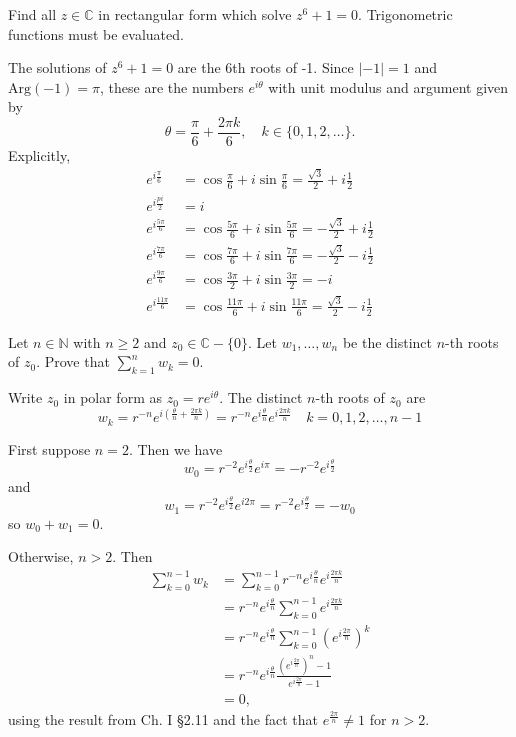 \documentclass{article}
\newcounter{Problem}
\newenvironment{Problem}{\begin{Exercise}[name={Problem},
                                          counter={Problem}]}
                        {\end{Exercise}}
\begin{document}
\begin{Problem}
Find all $z \in \mathbb{C}$ in rectangular form which solve
$z^6 + 1 = 0$. Trigonometric functions must be evaluated.
\end{Problem}

\begin{Answer}
The solutions of $z^6 + 1 = 0$ are the 6th roots of -1. Since $|-1| =
1$ and $\mathrm{Arg}(-1) = \pi$, these are the numbers $e^{i\theta}$ with unit
modulus and argument given by
$$
  \theta
= \frac{\pi}{6} + \frac{2 \pi k}{6},
\quad k \in \{ 0, 1, 2, \dots \}.
$$
Explicitly,
\begin{align*}
   e^{i\frac{\pi}{6}}
&= \cos \frac{\pi}{6} + i \sin \frac{\pi}{6}
 = \frac{\sqrt{3}}{2} + i \frac{1}{2} \\
   e^{i\frac{pi}{2}}
&= i \\
   e^{i\frac{5 \pi}{6}}
&= \cos \frac{5\pi}{6} + i \sin \frac{5\pi}{6}
 = -\frac{\sqrt{3}}{2} + i \frac{1}{2} \\
   e^{i\frac{7\pi}{6}}
&= \cos \frac{7\pi}{6} + i \sin \frac{7\pi}{6}
 = -\frac{\sqrt{3}}{2} - i \frac{1}{2} \\
   e^{i\frac{9\pi}{6}}
&= \cos \frac{3\pi}{2} + i \sin \frac{3\pi}{2}
 = -i \\
   e^{i\frac{11\pi}{6}}
&= \cos \frac{11\pi}{6} + i \sin \frac{11\pi}{6}
 = \frac{\sqrt{3}}{2} - i \frac{1}{2}
\end{align*}

\end{Answer}

\begin{Problem}
Let $n \in \mathbb{N}$ with $n \geq 2$ and
$z_0 \in \mathbb{C} - \{ 0 \}$.
Let $w_1, \dots, w_n$ be the distinct $n$-th roots of $z_0$.
Prove that $\sum_{k=1}^n w_k = 0$.
\end{Problem}

\begin{Answer}
Write $z_0$ in polar form as $z_0 = r e^{i \theta}$. The
distinct $n$-th roots of $z_0$ are
$$
  w_k
= r^{-n} e^{i\left(\frac{\theta}{n} + \frac{2 \pi k}{n}\right)}
= r^{-n} e^{i \frac{\theta}{n}} e^{i \frac{2 \pi k}{n}}
\quad k = 0, 1, 2, \dots, n-1
$$

First suppose $n = 2$. Then we have
$$
w_0 = r^{-2} e^{i \frac{\theta}{2}} e^{i \pi} = -r^{-2} e^{i \frac{\theta}{2}}
$$
and
$$
w_1 = r^{-2} e^{i \frac{\theta}{2}} e^{i 2 \pi} = r^{-2} e^{i
  \frac{\theta}{2}} = -w_0
$$
so $w_0 + w_1 = 0$.

Otherwise, $n > 2$. Then
\begin{align*}
   \sum_{k = 0}^{n-1} w_k
&= \sum_{k=0}^{n-1} r^{-n} e^{i\frac{\theta}{n}} e^{i\frac{2 \pi k}{n}} \\
&= r^{-n} e^{i\frac{\theta}{n}} \sum_{k=0}^{n-1} e^{i\frac{2 \pi k}{n}} \\
&= r^{-n} e^{i\frac{\theta}{n}} \sum_{k=0}^{n-1} (e^{i\frac{2 \pi}{n}})^k \\
&= r^{-n} e^{i\frac{\theta}{n}} \frac{(e^{i\frac{2 \pi}{n}})^n -
  1}{e^{i \frac{2\pi}{n}} - 1} \\
&= 0,
\end{align*}
using the result from Ch. I \S 2.11 and the fact that
$e^{\frac{2 \pi}{n}} \neq 1$ for $n > 2$.
\end{Answer}
\end{document}
